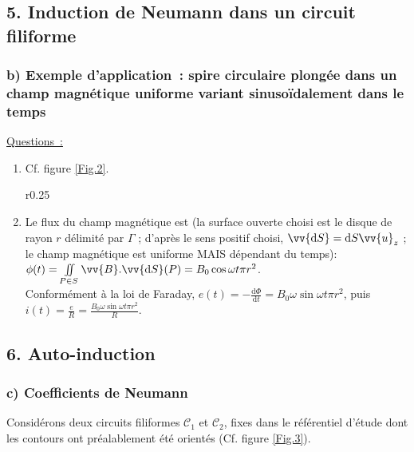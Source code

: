 \documentclass{article}
\let\oldiint\iint
\renewcommand{\iint}{\oldiint\limits}
\renewcommand\overrightarrow{\vv}
\begin{document}
\subsection*{5. Induction de Neumann dans un circuit filiforme}
\subsubsection*{b) Exemple d'application : spire circulaire plongée dans un
champ magnétique uniforme variant sinusoïdalement dans le temps}
\underline{Questions :}
\begin{enumerate}
\item Cf. figure \ref{Fig.2}.



\begin{wrapfigure}{r}{0.25\textwidth}
\caption{}\label{Fig.2}
\end{wrapfigure}




\item Le flux du champ magnétique est (la surface ouverte choisi est le disque de rayon $r$ délimité par $\Gamma$ ; d'après le sens positif
choisi, $\overrightarrow{\mathrm{d}S}=\mathrm{d}S\overrightarrow{u}_{z}$ ; le champ
magnétique est uniforme MAIS dépendant du temps): $\phi(t) =
\iint_{P\in S} \overrightarrow{B}.\overrightarrow{\mathrm{d}S}(P) = B_{0}\cos
\omega t \pi r^{2}$. \\
Conformément à la loi de Faraday, $e(t) = -\frac{\mathrm{d}\Phi}{\mathrm{d}t} =
B_{0}\omega \sin\omega t \pi r^{2}$, puis $i(t) = \frac{e}{R} =
\frac{B_{0}\omega \sin\omega t \pi r^{2}}{R}$.
\end{enumerate}

\subsection*{6. Auto-induction}
\subsubsection*{c) Coefficients de Neumann}
Considérons deux circuits filiformes $\mathcal{C}_{1}$ et
$\mathcal{C}_{2}$, fixes dans le référentiel d'étude dont les
contours ont préalablement été orientés (Cf. figure \ref{Fig.3}).
\end{document}
